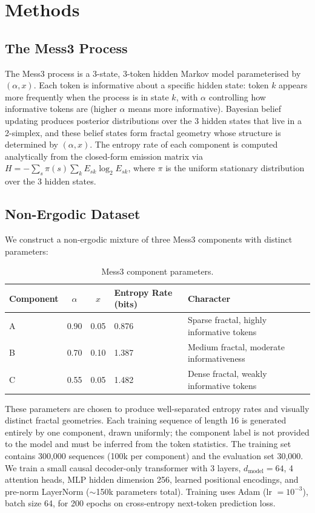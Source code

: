 \documentclass{article}
\begin{document}
\section{Methods}

\subsection{The Mess3 Process}

The Mess3 process \citep{shai2024} is a 3-state, 3-token hidden Markov model parameterised by $(\alpha, x)$. Each token is informative about a specific hidden state: token $k$ appears more frequently when the process is in state $k$, with $\alpha$ controlling how informative tokens are (higher $\alpha$ means more informative). Bayesian belief updating produces posterior distributions over the 3 hidden states that live in a 2-simplex, and these belief states form fractal geometry whose structure is determined by $(\alpha, x)$. The entropy rate of each component is computed analytically from the closed-form emission matrix via $H = -\sum_s \pi(s) \sum_k E_{sk} \log_2 E_{sk}$, where $\pi$ is the uniform stationary distribution over the 3 hidden states.

\subsection{Non-Ergodic Dataset}

We construct a non-ergodic mixture of three Mess3 components with distinct parameters:

\begin{table}[h]
\centering
\caption{Mess3 component parameters.}
\label{tab:components}
\begin{tabular}{@{}lccll@{}}
\toprule
Component & $\alpha$ & $x$ & Entropy Rate (bits) & Character \\
\midrule
A & 0.90 & 0.05 & 0.876 & Sparse fractal, highly informative tokens \\
B & 0.70 & 0.10 & 1.387 & Medium fractal, moderate informativeness \\
C & 0.55 & 0.05 & 1.482 & Dense fractal, weakly informative tokens \\
\bottomrule
\end{tabular}
\end{table}

These parameters are chosen to produce well-separated entropy rates and visually distinct fractal geometries. Each training sequence of length 16 is generated entirely by one component, drawn uniformly; the component label is not provided to the model and must be inferred from the token statistics. The training set contains 300,000 sequences (100k per component) and the evaluation set 30,000. We train a small causal decoder-only transformer with 3 layers, $d_\text{model} = 64$, 4 attention heads, MLP hidden dimension 256, learned positional encodings, and pre-norm LayerNorm ($\sim$150k parameters total). Training uses Adam (lr $= 10^{-3}$), batch size 64, for 200 epochs on cross-entropy next-token prediction loss.
\end{document}
